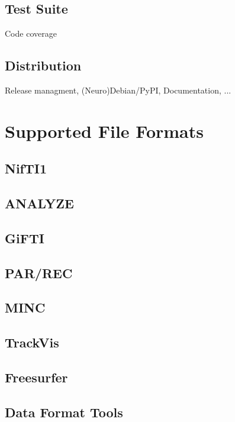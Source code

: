 \documentclass[twoside=false,fontsize=11pt,pointednumbers,normalheadings,%
               abstracton,paper=a4,pagesize,pdftex]{scrartcl}
\begin{document}
\subsection{Test Suite}

Code coverage

\subsection{Distribution}

Release managment, (Neuro)Debian/PyPI, Documentation, ...

\section{Supported File Formats}

\subsection{NifTI1}

\subsection{ANALYZE}

\subsection{GiFTI}

\subsection{PAR/REC}

\subsection{MINC}

\subsection{TrackVis}

\subsection{Freesurfer}

\subsection{Data Format Tools}
\end{document}
